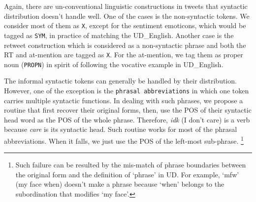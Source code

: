 \documentclass[11pt,letterpaper]{article}
\newcommand{\heart}{\ensuremath\heartsuit}
\begin{document}
Again, there are un-conventional linguistic constructions in tweets that syntactic distribution doesn't handle well.
One of the cases is the non-syntactic tokens.
We consider most of them as {\tt X}, except for the sentiment emoticons, which would be tagged as {\tt SYM}, in practice of matching the UD\_English.
Another case is the retweet construction which is considered as a non-syntactic phrase and both the RT and at-mention are tagged as {\tt X}.
For the at-mention, we tag them as proper noun ({\tt PROPN}) in spirit of following the vocative example in UD\_English.


The informal syntactic tokens can generally be handled by their distribution.
However, one of the exception is the {\tt phrasal abbreviations} in which one token carries multiple syntactic functions.
In dealing with such phrases, we propose a routine that first recover their original forms, then, use the POS of their syntactic head word as the POS of the whole phrase.
Therefore, {\it idk} (I don't care) is a verb because {\it care} is its syntactic head.
Such routine works for most of the phrasal abbreviations.
When it falls, we just use the POS of the left-most sub-phrase. \footnote{Such failure can be resulted by the mis-match of phrase boundaries between the original form and the definition of `phrase' in UD. For example, `mfw' (my face when) doesn't make a phrase because `when' belongs to the subordination that modifies `my face'.}

\end{document}
